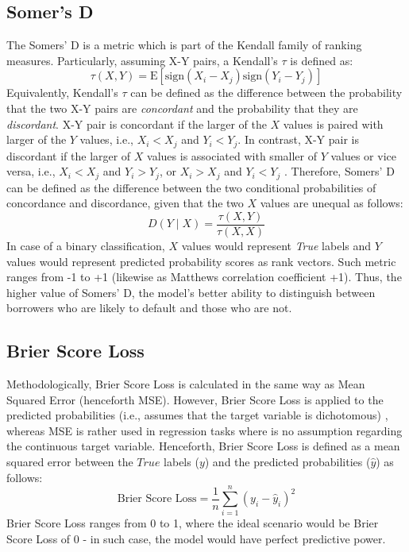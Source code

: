 \subsection{Somer's D}

The Somers' D is a metric which is part of the Kendall family of ranking measures. Particularly, assuming X-Y pairs, a Kendall's $\tau$ is defined as:
\begin{equation}\label{eq}
    \tau\left(X,Y\right) = \text{E} \left[ \text{sign}(X_i - X_j) \text{sign} (Y_i - Y_j) \right]
\end{equation}
Equivalently, Kendall's $\tau$ can be defined as the difference between the probability that the two X-Y pairs are \textit{concordant} and the probability that they are \textit{discordant}. X-Y pair is concordant if the larger of the $X$ values is paired with larger of the $Y$ values, i.e., $X_i < X_j$ and $Y_i < Y_j$.
In contrast, X-Y pair is discordant if the larger of $X$ values is associated with smaller of $Y$ values or vice versa, i.e., $X_i < X_j$ and $Y_i > Y_j$, or $X_i > X_j$ and $Y_i < Y_j$ \citep{newson2002parameters}.
\newpage
Therefore, Somers' D can be defined as the difference between the two conditional probabilities of concordance and discordance, given that the two $X$ values are unequal \citep{newson2014interpretation} as follows:
\begin{equation}
    D\left(Y \mid X\right) = \frac{\tau\left(X,Y\right)}{\tau\left(X,X\right)}
\end{equation}
In case of a binary classification, $X$ values would represent \textit{True} labels and $Y$ values would represent predicted probability scores as rank vectors. Such metric ranges from -1 to +1 (likewise as Matthews correlation coefficient +1). Thus, the higher value of Somers' D, the model's better ability to distinguish between borrowers who are likely to default and those who are not.

\subsection{Brier Score Loss}
Methodologically, Brier Score Loss is calculated in the same way as Mean Squared Error (henceforth MSE). However, Brier Score Loss is applied to the predicted probabilities (i.e., assumes that the target variable is dichotomous) \citep{comotto2022evaluation}, whereas MSE is rather used in regression tasks where is no assumption regarding the continuous target variable.
Henceforth, Brier Score Loss is defined as a mean squared error between the $True$ labels ($y$) and the predicted probabilities ($\hat{y}$) as follows:
\begin{equation}\label{eq}
    \text{Brier Score Loss} = \frac{1}{n} \sum_{i=1}^{n} (y_i - \hat{y}_i)^2
\end{equation}
Brier Score Loss ranges from 0 to 1, where the ideal scenario would be Brier Score Loss of 0 - in such case, the model would have perfect predictive power.

